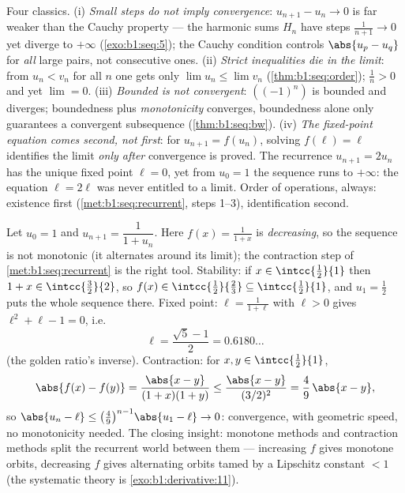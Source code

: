 \begin{remark}
Four classics. (i) \emph{Small steps do not imply convergence}:
$u_{n+1} - u_n \to 0$ is far weaker than the Cauchy property ---
the harmonic sums $H_n$ have steps $\frac{1}{n+1} \to 0$ yet
diverge to $+\infty$ (\cref{exo:b1:seq:5}); the Cauchy condition
controls $\abs{u_p - u_q}$ for \emph{all} large pairs, not
consecutive ones. (ii) \emph{Strict inequalities die in the
limit}: from $u_n < v_n$ for all $n$ one gets only $\lim u_n
\leq \lim v_n$ (\cref{thm:b1:seq:order}); $\frac1n > 0$ and yet
$\lim = 0$. (iii) \emph{Bounded is not convergent}: $((-1)^n)$
is bounded and diverges; boundedness plus \emph{monotonicity}
converges, boundedness alone only guarantees a convergent
subsequence (\cref{thm:b1:seq:bw}). (iv) \emph{The fixed-point
equation comes second, not first}: for $u_{n+1} = f(u_n)$,
solving $f(\ell) = \ell$ identifies the limit \emph{only after}
convergence is proved. The recurrence $u_{n+1} = 2u_n$ has the
unique fixed point $\ell = 0$, yet from $u_0 = 1$ the sequence
runs to $+\infty$: the equation $\ell = 2\ell$ was never
entitled to a limit. Order of operations, always: existence
first (\cref{met:b1:seq:recurrent}, steps 1--3), identification
second.
\end{remark}

\begin{example}\label{ex:b1:seq:golden}
Let $u_0 = 1$ and $u_{n+1} = \dfrac{1}{1 + u_n}$. Here $f(x) =
\frac{1}{1+x}$ is \emph{decreasing}, so the sequence is not
monotonic (it alternates around its limit); the contraction step
of \cref{met:b1:seq:recurrent} is the right tool. Stability: if
$x \in \intcc{\frac12}{1}$ then $1 + x \in
\intcc{\frac32}{2}$, so $f(x) \in \intcc{\frac12}{\frac23}
\subseteq \intcc{\frac12}{1}$, and $u_1 = \frac12$ puts the
whole sequence there. Fixed point: $\ell = \frac{1}{1+\ell}$
with $\ell > 0$ gives $\ell^2 + \ell - 1 = 0$, i.e.
\[
\ell = \frac{\sqrt5 - 1}{2} = 0.6180\dots
\]
(the golden ratio's inverse). Contraction: for $x, y \in
\intcc{\frac12}{1}$,
\[
\abs{f(x) - f(y)} = \frac{\abs{x - y}}{(1+x)(1+y)}
\leq \frac{\abs{x-y}}{(3/2)^2} = \frac49\,\abs{x - y} ,
\]
so $\abs{u_n - \ell} \leq \bigl(\frac49\bigr)^{n-1}\abs{u_1 -
\ell} \to 0$: convergence, with geometric speed, no
monotonicity needed. The closing insight: monotone methods and
contraction methods split the recurrent world between them ---
increasing $f$ gives monotone orbits, decreasing $f$ gives
alternating orbits tamed by a Lipschitz constant $< 1$ (the
systematic theory is \cref{exo:b1:derivative:11}).
\end{example}

